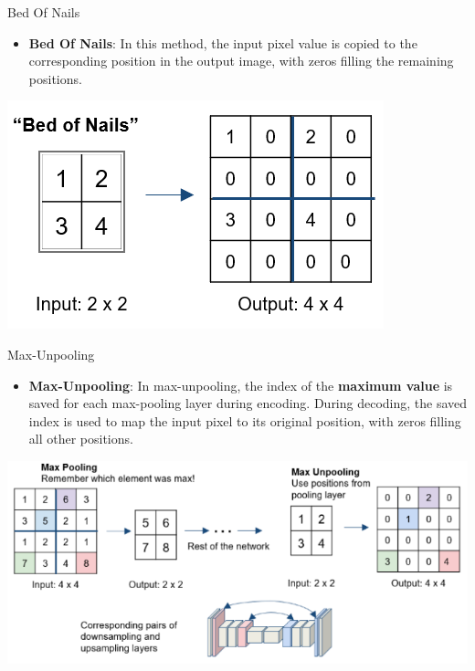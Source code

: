 \documentclass[default, aspectratio=169]{beamer}
\begin{document}
	\begin{frame}{Bed Of Nails}
		\vspace{0.5cm}
		\begin{itemize}
			\item \textbf{Bed Of Nails}: In this method, the input pixel value is copied to the corresponding position in the output image, with zeros filling the remaining positions.
		\end{itemize}
		
		\centering
		\includegraphics[keepaspectratio, scale=0.4]{pic/Upsamlpe_3.png}
		
	\end{frame}
	\begin{frame}{Max-Unpooling}
		\vspace{0.5cm}
		\begin{itemize}
			\item \textbf{Max-Unpooling}: In max-unpooling, the index of the \textbf{maximum value} is saved for each max-pooling layer during encoding. During decoding, the saved index is used to map the input pixel to its original position, with zeros filling all other positions.
		\end{itemize}
		
		\centering
		\includegraphics[keepaspectratio, scale=0.3]{pic/Upsamlpe_4.png}
	\end{frame}
	
\end{document}
